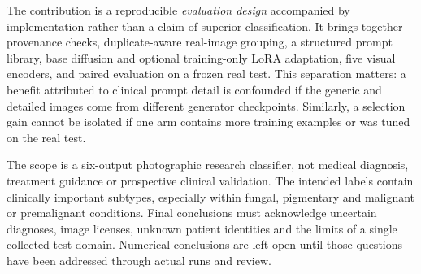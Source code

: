 The contribution is a reproducible \emph{evaluation design} accompanied by implementation rather than a claim of superior classification. It brings together provenance checks, duplicate-aware real-image grouping, a structured prompt library, base diffusion and optional training-only LoRA adaptation, five visual encoders, and paired evaluation on a frozen real test. This separation matters: a benefit attributed to clinical prompt detail is confounded if the generic and detailed images come from different generator checkpoints. Similarly, a selection gain cannot be isolated if one arm contains more training examples or was tuned on the real test.

The scope is a six-output photographic research classifier, not medical diagnosis, treatment guidance or prospective clinical validation. The intended labels contain clinically important subtypes, especially within fungal, pigmentary and malignant or premalignant conditions. Final conclusions must acknowledge uncertain diagnoses, image licenses, unknown patient identities and the limits of a single collected test domain. Numerical conclusions are left open until those questions have been addressed through actual runs and review.
